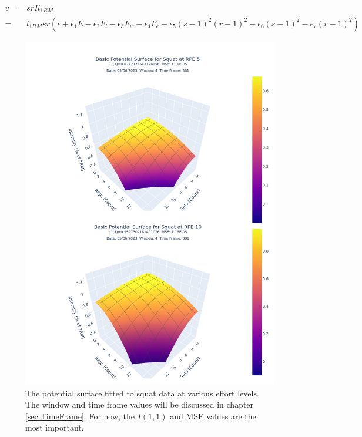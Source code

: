 \begin{equation}
    \label{eq:IntensitySubedInVolume}
    \begin{split}
    		v = & srI l_{1RM} \\
    			= & l_{1RM} sr \left( 
    			\epsilon+
    			\epsilon_1 E-
    			\epsilon_2 F_l-
    			\epsilon_3 F_w-
    			\epsilon_4 F_e-
    			\epsilon_5(s-1)^2(r-1)^2-
    			\epsilon_6(s-1)^2-
    			\epsilon_7(r-1)^2
    		\right)
    \end{split}
\end{equation}

\begin{figure}[htbp]
    \centering
    \includegraphics[scale=0.55]{images/ch3/PotentialSurface/DualSquat.Effort[5,10].basic.png}
    \caption{The potential surface fitted to squat data at various effort levels. The window and time frame values will be discussed in chapter \ref{sec:TimeFrame}. For now, the $I(1,1)$ and MSE values are the most important.}
    \label{fig:SquatPotentialSurfaceAcrossEffort}
\end{figure}

